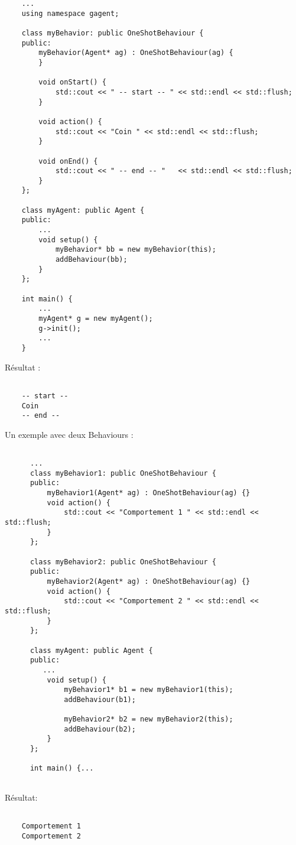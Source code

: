 \begin{lstlisting}
	...
	using namespace gagent;

	class myBehavior: public OneShotBehaviour {
	public:
		myBehavior(Agent* ag) : OneShotBehaviour(ag) {
		}

		void onStart() {
			std::cout << " -- start -- " << std::endl << std::flush;
		}

		void action() {
			std::cout << "Coin " << std::endl << std::flush;
		}

		void onEnd() {
			std::cout << " -- end -- "   << std::endl << std::flush;
		}
	};

	class myAgent: public Agent {
	public:
		...
		void setup() {
			myBehavior* bb = new myBehavior(this);
			addBehaviour(bb);
		}
	};

	int main() {
		...
		myAgent* g = new myAgent();
		g->init();
		...
	}
\end{lstlisting}

Résultat : 

\begin{lstlisting}[backgroundcolor=\color{green!5}]

	-- start -- 
	Coin 
	-- end -- 

\end{lstlisting}

Un exemple avec deux Behaviours : 

\begin{lstlisting}

	  ...
	  class myBehavior1: public OneShotBehaviour {
	  public:
		  myBehavior1(Agent* ag) : OneShotBehaviour(ag) {}
		  void action() {
			  std::cout << "Comportement 1 " << std::endl << std::flush;
		  }
	  };

	  class myBehavior2: public OneShotBehaviour {
	  public:
		  myBehavior2(Agent* ag) : OneShotBehaviour(ag) {}
		  void action() {
			  std::cout << "Comportement 2 " << std::endl << std::flush;
		  }
	  };

	  class myAgent: public Agent {
	  public:
		 ...
		  void setup() {
			  myBehavior1* b1 = new myBehavior1(this);
			  addBehaviour(b1);

			  myBehavior2* b2 = new myBehavior2(this);
			  addBehaviour(b2);
		  }
	  };
	  
	  int main() {...
	  
\end{lstlisting}

Résultat:

\begin{lstlisting}[backgroundcolor=\color{green!5}]

	Comportement 1 
	Comportement 2 

\end{lstlisting}



